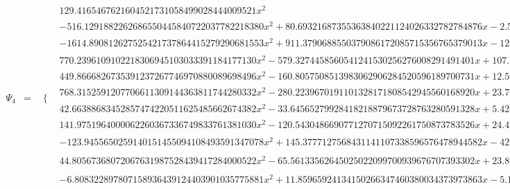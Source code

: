 \documentclass{article}
\begin{document}
\begin{landscape}
\begin{eqnarray*}
\begin{array}{cc}
\end{array}\\
\Psi_4 & = & \begin{array}{cc}
 \{ & 
\begin{array}{cc}
 129.4165467621604521731058499028444009521 x^2 & x\geq 0\land x<\frac{1}{16} \\
 -516.1291882262686550445840722037782218380 x^2+80.69321687355363840221124026332782784876 x-2.521663027298551200069101258228994620274 & x\geq \frac{1}{16}\land x<\frac{1}{8} \\
 -1614.890812627525421737864415279290681553 x^2+911.3790688550379086172085715356765379013 x-125.1828992630345760992010110072985409600 & x\geq \frac{1}{4}\land x<\frac{5}{16} \\
 770.2396109102218306945103033391184177130 x^2-579.3274458560541241530256276008291491401 x+107.7399936605735540211480826077804726402 & x\geq \frac{5}{16}\land x<\frac{3}{8} \\
 449.8666826735391237267746970880089698496 x^2-160.8057508513983062906284520596189700731 x+12.57202245551094534323337951195518024985 & x\geq \frac{1}{8}\land x<\frac{3}{16} \\
 768.3152591207706611309144363811744280332 x^2-280.2239670191101328171808542945560168920 x+23.76748022123392908009766722148052838911 & x\geq \frac{3}{16}\land x<\frac{1}{4} \\
 42.66388683452857474220511625485662674382 x^2-33.64565279928418218879673728763280591328 x+5.424657462429189902855165674056158285138 & x\geq \frac{3}{8}\land x<\frac{7}{16} \\
 141.9751964000062260367336749833761381030 x^2-120.5430486690771270715092261750873783526 x+24.43346280894639659594852261818684600624 & x\geq \frac{7}{16}\land x<\frac{1}{2} \\
 -123.9455650259140151455094108493591347078 x^2+145.3777127568431141107338596576478944582 x-42.04672754753366369961224883999697219646 & \left(x\geq \frac{1}{2}\land x<\frac{9}{16}\right)\lor \left(x\geq \frac{9}{16}\land x<\frac{5}{8}\right) \\
 44.80567368072067631987528439417284000522 x^2-65.56133562645025022099700939676707393302 x+23.87172507224551265405364773950770542580 & \left(x\geq \frac{5}{8}\land x<\frac{11}{16}\right)\lor \left(x\geq \frac{11}{16}\land x<\frac{3}{4}\right) \\
 -6.808322897807158936439124403901035775881 x^2+11.85965924134150266347460380034373973863 x-5.161148003176394677623207209408849701071 & \left(x\geq \frac{3}{4}\land x<\frac{13}{16}\right)\lor \left(x\geq \frac{13}{16}\land x<\frac{7}{8}\right) \\

\end{array}
\end{array}
\end{eqnarray*}
\end{landscape}
\end{document}

